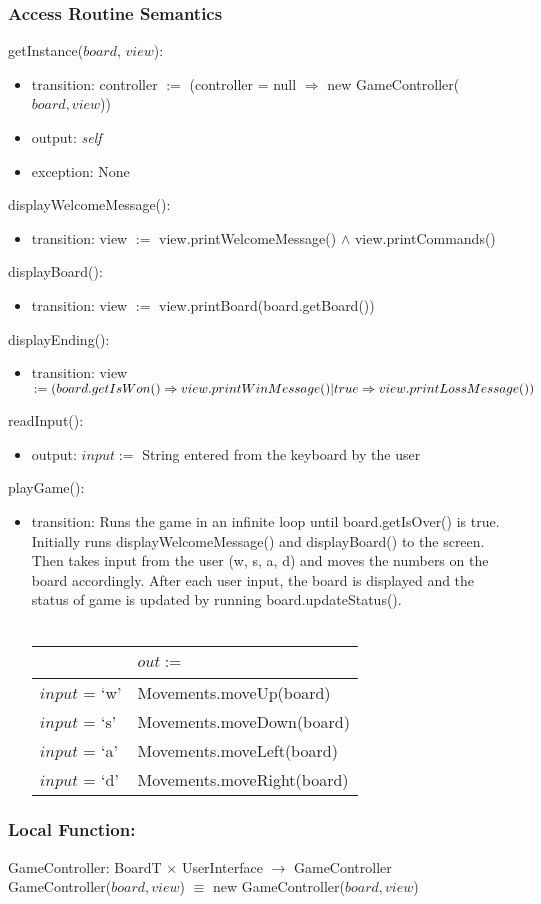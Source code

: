 \documentclass[12pt]{article}
\begin{document}
\subsubsection* {Access Routine Semantics}
getInstance($board$, $view$):
\begin{itemize}
  \item transition: controller $:=$ (controller = null $\Rightarrow$ new GameController($board, view$))
  \item output: \textit{self}
  \item exception: None
\end{itemize}

\noindent displayWelcomeMessage():
\begin{itemize}
  \item transition: view $:=$ view.printWelcomeMessage() $\wedge$ view.printCommands()
\end{itemize}

\noindent displayBoard():
\begin{itemize}
  \item transition: view $:=$ view.printBoard(board.getBoard())
\end{itemize}

\noindent displayEnding():
\begin{itemize}
  \item transition: view $:= (board.getIsWon() \Rightarrow view.printWinMessage() | \\ true \Rightarrow view.printLossMessage())$
\end{itemize}

\noindent readInput():
\begin{itemize}
  \item output: $input :=$ String entered from the keyboard by the user 
\end{itemize}

\noindent playGame():
\begin{itemize}
  \item transition: Runs the game in an infinite loop until board.getIsOver() is true. Initially runs displayWelcomeMessage() and displayBoard() to the screen. Then takes input from the user (w, s, a, d) and moves the numbers on the board accordingly. After each user input, the board is displayed and the status of game is updated by running board.updateStatus(). \\\\
  \begin{tabular}{| l | l |}
          \hline
          ~ & $out :=$ \\
          \hline
          $input$ = `w' & Movements.moveUp(board) \\
           \hline
          $input$ = `s' & Movements.moveDown(board) \\
           \hline
          $input$ = `a' & Movements.moveLeft(board) \\
           \hline
          $input$ = `d' & Movements.moveRight(board) \\
           \hline
        \end{tabular}
\end{itemize}


\subsubsection*{Local Function:}
GameController: BoardT $\times$ UserInterface $\rightarrow$ GameController \\
GameController($board, view$) $\equiv$ new GameController($board, view$)
\end{document}
